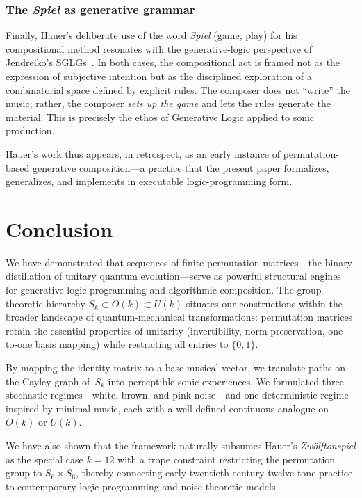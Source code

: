 \documentclass[
  twocolumn,
  aps,
  pra,
  showkeys,
  amsmath,amssymb,
  longbibliography
]{revtex4-2}
\begin{document}
\subsubsection{The \emph{Spiel} as generative grammar}

Finally, Hauer's deliberate use of the word \emph{Spiel}
(game, play) for his compositional method resonates with the
generative-logic perspective of Jendreiko's
SGLGs~\cite{Jendreiko2024,Jendreiko2025}.
In both cases, the compositional act is framed not as the
expression of subjective intention but as the disciplined
exploration of a combinatorial space defined by explicit rules.
The composer does not ``write'' the music; rather, the
composer \emph{sets up the game} and lets the rules
generate the material.
This is precisely the ethos of Generative Logic applied to
sonic production.

Hauer's work thus appears, in retrospect, as an early
instance of permutation-based generative composition---a
practice that the present paper formalizes, generalizes, and
implements in executable logic-programming form.


\section{Conclusion}
\label{sec:conclusion}

We have demonstrated that sequences of finite permutation
matrices---the binary distillation of unitary quantum
evolution---serve as powerful structural engines for generative
logic programming and algorithmic composition.
The group-theoretic hierarchy
$S_k\subset O(k)\subset U(k)$ situates our constructions
within the broader landscape of quantum-mechanical
transformations: permutation matrices retain the essential
properties of unitarity (invertibility, norm preservation,
one-to-one basis mapping) while restricting all entries to
$\{0,1\}$.

By mapping the identity matrix to a base musical vector, we
translate paths on the Cayley graph of~$S_k$ into perceptible
sonic experiences.
We formulated three stochastic
regimes---white, brown, and pink noise---and one deterministic
regime inspired by minimal music, each with a well-defined
continuous analogue on $O(k)$ or $U(k)$.

We have also shown that the framework naturally subsumes
Hauer's \emph{Zw\"olftonspiel} as the special case $k=12$
with a trope constraint restricting the permutation group to
$S_6\times S_6$, thereby connecting early twentieth-century
twelve-tone practice to contemporary logic programming and
noise-theoretic models.
\end{document}
